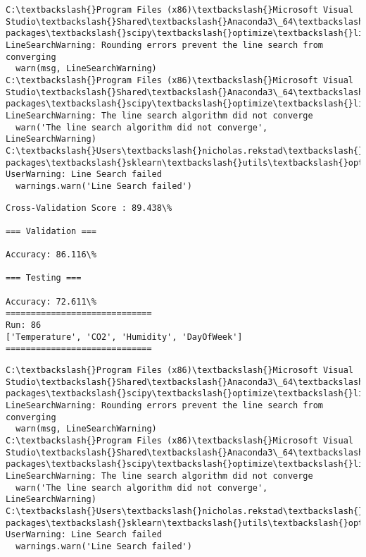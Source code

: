 \documentclass[11pt]{article}
\begin{document}
    \begin{Verbatim}[commandchars=\\\{\}]
C:\textbackslash{}Program Files (x86)\textbackslash{}Microsoft Visual Studio\textbackslash{}Shared\textbackslash{}Anaconda3\_64\textbackslash{}lib\textbackslash{}site-packages\textbackslash{}scipy\textbackslash{}optimize\textbackslash{}linesearch.py:422: LineSearchWarning: Rounding errors prevent the line search from converging
  warn(msg, LineSearchWarning)
C:\textbackslash{}Program Files (x86)\textbackslash{}Microsoft Visual Studio\textbackslash{}Shared\textbackslash{}Anaconda3\_64\textbackslash{}lib\textbackslash{}site-packages\textbackslash{}scipy\textbackslash{}optimize\textbackslash{}linesearch.py:313: LineSearchWarning: The line search algorithm did not converge
  warn('The line search algorithm did not converge', LineSearchWarning)
C:\textbackslash{}Users\textbackslash{}nicholas.rekstad\textbackslash{}AppData\textbackslash{}Roaming\textbackslash{}Python\textbackslash{}Python36\textbackslash{}site-packages\textbackslash{}sklearn\textbackslash{}utils\textbackslash{}optimize.py:195: UserWarning: Line Search failed
  warnings.warn('Line Search failed')

    \end{Verbatim}

    \begin{Verbatim}[commandchars=\\\{\}]
Cross-Validation Score : 89.438\%

=== Validation ===

Accuracy: 86.116\%

=== Testing ===

Accuracy: 72.611\%
=============================
Run: 86
['Temperature', 'CO2', 'Humidity', 'DayOfWeek']
=============================

    \end{Verbatim}

    \begin{Verbatim}[commandchars=\\\{\}]
C:\textbackslash{}Program Files (x86)\textbackslash{}Microsoft Visual Studio\textbackslash{}Shared\textbackslash{}Anaconda3\_64\textbackslash{}lib\textbackslash{}site-packages\textbackslash{}scipy\textbackslash{}optimize\textbackslash{}linesearch.py:422: LineSearchWarning: Rounding errors prevent the line search from converging
  warn(msg, LineSearchWarning)
C:\textbackslash{}Program Files (x86)\textbackslash{}Microsoft Visual Studio\textbackslash{}Shared\textbackslash{}Anaconda3\_64\textbackslash{}lib\textbackslash{}site-packages\textbackslash{}scipy\textbackslash{}optimize\textbackslash{}linesearch.py:313: LineSearchWarning: The line search algorithm did not converge
  warn('The line search algorithm did not converge', LineSearchWarning)
C:\textbackslash{}Users\textbackslash{}nicholas.rekstad\textbackslash{}AppData\textbackslash{}Roaming\textbackslash{}Python\textbackslash{}Python36\textbackslash{}site-packages\textbackslash{}sklearn\textbackslash{}utils\textbackslash{}optimize.py:195: UserWarning: Line Search failed
  warnings.warn('Line Search failed')

    \end{Verbatim}
\end{document}
